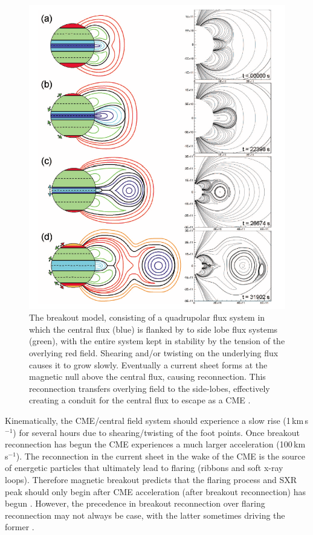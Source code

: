 \begin{figure}[!t]
\begin{center}
\includegraphics[scale=0.45, trim=0cm 0cm 0cm 1cm]{images/lynch_breakout}
\caption[The breakout CME model]{The breakout model, consisting of a quadrupolar flux system in which the central flux (blue) is flanked by to side lobe flux systems (green), with the entire system kept in stability by the tension of the overlying red field. Shearing and/or twisting on the underlying flux causes it to grow slowly. Eventually a current sheet forms at the magnetic null above the central flux, causing reconnection. This reconnection transfers overlying field to the side-lobes, effectively creating a conduit for the central flux to escape as a CME \citep{lynch2008}.}
\label{fig:breakout_model}
\end{center}
\end{figure}

Kinematically, the CME/central field system should experience a slow rise (1\,km\,s$^{-1}$) for several hours due to shearing/twisting of the foot points. Once breakout reconnection has begun the CME experiences a much larger acceleration (100\,km\,s$^{-1}$). The reconnection in the current sheet in the wake of the CME is the source of energetic particles that ultimately lead to flaring (ribbons and soft x-ray loops). Therefore magnetic breakout predicts that the flaring process and SXR peak should only begin after CME acceleration (after breakout reconnection) has begun \citep{lynch2004}. However, the precedence in breakout reconnection over flaring reconnection may not always be case, with the latter sometimes driving the former \citep{macneice2004}. 

